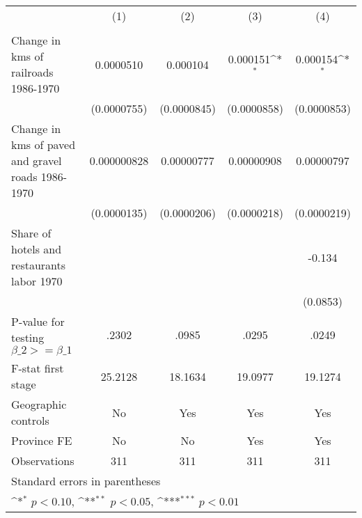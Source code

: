 {
\def\sym#1{\ifmmode^{#1}\else\(^{#1}\)\fi}
\begin{tabular}{l*{4}{c}}
\hline\hline
                &\multicolumn{1}{c}{(1)}&\multicolumn{1}{c}{(2)}&\multicolumn{1}{c}{(3)}&\multicolumn{1}{c}{(4)}\\
                &\multicolumn{1}{c}{}&\multicolumn{1}{c}{}&\multicolumn{1}{c}{}&\multicolumn{1}{c}{}\\
\hline
Change in kms of railroads 1986-1970&0.0000510         & 0.000104         & 0.000151\sym{*}  & 0.000154\sym{*}  \\
                &(0.0000755)         &(0.0000845)         &(0.0000858)         &(0.0000853)         \\
[1em]
Change in kms of paved and gravel roads 1986-1970&0.000000828         &0.00000777         &0.00000908         &0.00000797         \\
                &(0.0000135)         &(0.0000206)         &(0.0000218)         &(0.0000219)         \\
[1em]
Share of hotels and restaurants labor 1970&                  &                  &                  &   -0.134         \\
                &                  &                  &                  & (0.0853)         \\
\hline
P-value for testing $\beta\_{2} >= \beta\_{1}$&    .2302         &    .0985         &    .0295         &    .0249         \\
F-stat first stage&  25.2128         &  18.1634         &  19.0977         &  19.1274         \\
Geographic controls&       No         &      Yes         &      Yes         &      Yes         \\
Province FE     &       No         &       No         &      Yes         &      Yes         \\
Observations    &      311         &      311         &      311         &      311         \\
\hline\hline
\multicolumn{5}{l}{\footnotesize Standard errors in parentheses}\\
\multicolumn{5}{l}{\footnotesize \sym{*} \(p<0.10\), \sym{**} \(p<0.05\), \sym{***} \(p<0.01\)}\\
\end{tabular}
}
